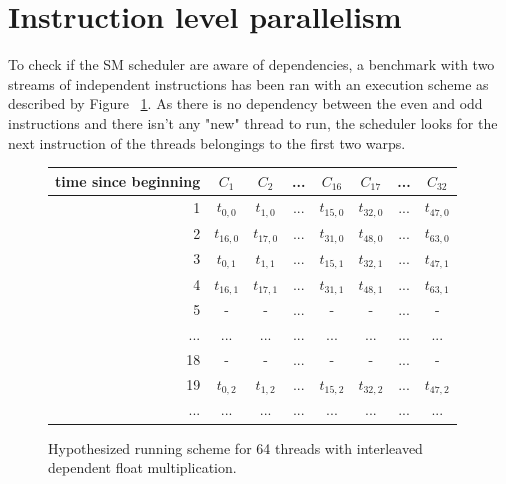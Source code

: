 \documentclass{report}
\begin{document}
\section{Instruction level parallelism}
    To check if the SM scheduler are aware of dependencies, a benchmark with two streams of independent instructions has been ran with an execution
    scheme as described by Figure ~\ref{fig:fp_prediction_64_halfdep}.
    As there is no dependency between the even and odd instructions and there isn't any "new" thread to run, the scheduler looks for the next instruction of the threads belongings to the first two warps.
\begin{figure}[H]
      \centering
       \begin{tabular}{ | r || c | c | c | c || c | c | c | }
    	    \hline
    	    time since beginning & $C_1$ & $C_2$ & ... & $C_{16}$ & $C_{17}$ & ... & $C_{32}$ \\ \hline  \hline
    	   1 & $t_{0,0}$ & $t_{1,0}$ & ... & $t_{15,0}$ & $t_{32, 0}$ & ... & $t_{47, 0}$ \\ \hline 
    	   2 & $t_{16,0}$ & $t_{17,0}$ & ... & $t_{31,0}$ & $t_{48, 0}$ & ... & $t_{63, 0}$ \\ \hline
    	   3 & $t_{0,1}$ & $t_{1,1}$ & ... & $t_{15,1}$ & $t_{32, 1}$ & ... & $t_{47, 1}$ \\ \hline
           4 & $t_{16,1}$ & $t_{17,1}$ & ... & $t_{31,1}$ & $t_{48, 1}$ & ... & $t_{63, 1}$ \\ \hline
    	   5 & - & - & ... & - & - & ... & - \\ \hline
    	   ... & ... & ... & ... & ... & ... & ... & ... \\ \hline
    	   18 & - & - & ... & - & - & ... & - \\ \hline
    	   19 & $t_{0,2}$ & $t_{1,2}$ & ... & $t_{15,2}$ & $t_{32,2}$ & ... & $t_{47,2}$ \\ \hline
    	   ... & ... & ... & ... & ... & ... & ... & ... \\ \hline
  	\end{tabular}
  	\captionsetup{justification=centering}
  	\caption{Hypothesized running scheme for 64 threads with interleaved dependent float multiplication.}
  	\label{fig:fp_prediction_64_halfdep}
   \end{figure}
\end{document}
